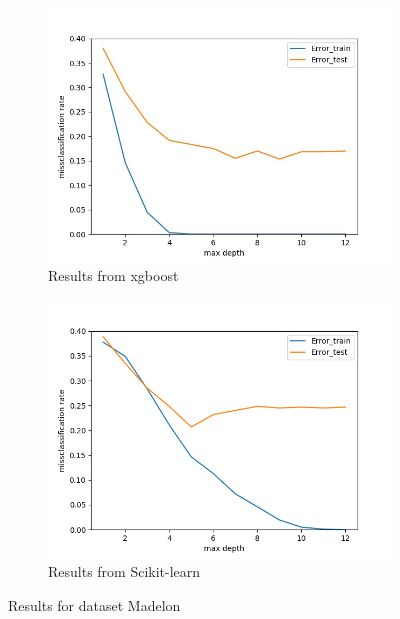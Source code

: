 \documentclass[a4paper]{article}
\begin{document}
\begin{figure}[h]
  	\centering
  	\begin{subfigure}[b]{0.3\linewidth}
  	\includegraphics[width=\textwidth]{madelon_result.jpeg}
	\caption{Results from xgboost}
	\end{subfigure}
	
    \begin{subfigure}[b]{0.3\linewidth}
    \includegraphics [width=\linewidth]{madelon.png}
    \caption{Results from Scikit\--learn}
    \end{subfigure}

\caption{Results for dataset Madelon}

	\label{fig1}
\end{figure}
\end{document}
